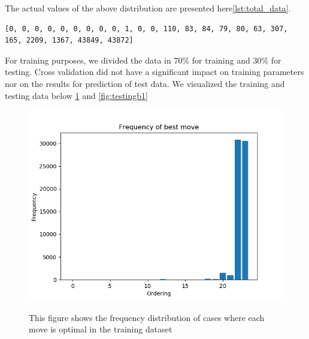 The actual values of the above distribution are presented here\ref{lst:total_data}.

\begin{lstlisting}[caption=Frequencies of optimal moves in total data, label={lst:total_data}]
[0, 0, 0, 0, 0, 0, 0, 0, 0, 1, 0, 0, 110, 83, 84, 79, 80, 63, 307, 165, 2209, 1367, 43849, 43872]
\end{lstlisting}

\par For training purposes, we divided the data in $70\%$ for training and $30\%$ for testing. Cross validation did not have a significant impact on training parameters nor on the results for prediction of test data. We visualized the training and testing data below \ref{fig:trainingb1} and \ref{fig:testingb1}

\begin{figure}
\centering
\includegraphics[scale=0.75]{trainingb1.png}\\
\caption{This figure shows the frequency distribution of cases where each move is optimal in the training dataset}
\label{fig:trainingb1}
\end{figure}

